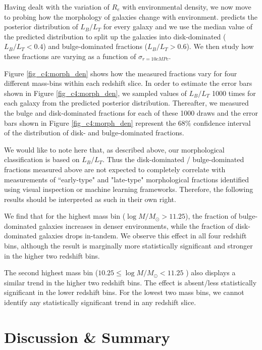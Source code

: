 Having dealt with the variation of $R_e$ with environmental density, we now move to probing how the morphology of galaxies change with environment. \gampen{} predicts the posterior distribution of $L_B/L_T$ for every galaxy and we use the median value of the predicted distribution to split up the galaxies into disk-dominated ($L_B/L_T < 0.4$) and bulge-dominated fractions ($L_B/L_T > 0.6$). We then study how these fractions are varying as a function of $\sigma_{r=10cMPc}$.

Figure \ref{fig_c4:morph_den} shows how the measured fractions vary for four different mass-bins within each redshift slice. In order to estimate the error bars shown in Figure \ref{fig_c4:morph_den}, we sampled values of $L_B/L_T$ 1000 times for each galaxy from the predicted posterior distribution. Thereafter, we measured the bulge and disk-dominated fractions for each of these 1000 draws and the error bars shown in Figure \ref{fig_c4:morph_den} represent the $68\%$ confidence interval of the distribution of disk- and bulge-dominated fractions. 

We would like to note here that, as described above, our morphological classification is based on $L_B/L_T$. Thus the disk-dominated / bulge-dominated fractions measured above are not expected to completely correlate with measurements of ``early-type" and "late-type" morphological fractions identified using visual inspection or machine learning frameworks. Therefore, the following results should be interpreted as such in their own right.


We find that for the highest mass bin ($\log M/M_{\odot} > 11.25$), the fraction of bulge-dominated galaxies increases in denser environments, while the fraction of disk-dominated galaxies drops in-tandem. We observe this effect in all four redshift bins, although the result is marginally more statistically significant and stronger in the higher two redshift bins. 

The second highest mass bin ($10.25 \leq \log M/M_{\odot} < 11.25$ ) also displays a similar trend in the higher two redshift bins. The effect is absent/less statistically significant in the lower redshift bins. For the lowest two mass bins, we cannot identify any statistically significant trend in any redshift slice. 


\section{Discussion \& Summary} \label{sec_c4:discussion}

